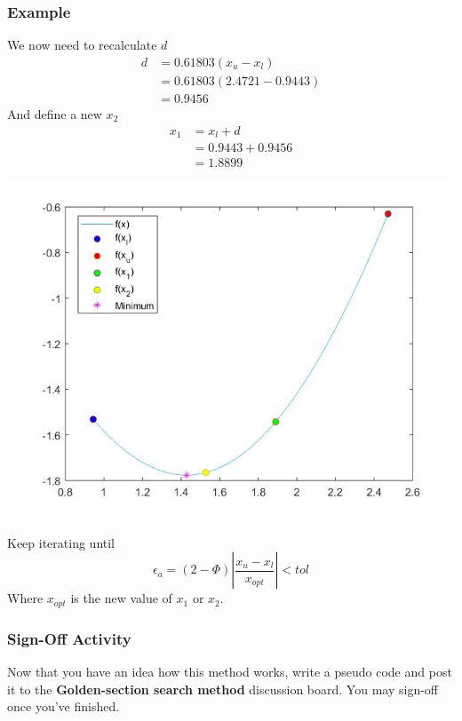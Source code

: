 \documentclass{if-beamer}
\begin{document}
\begin{frame}
	\frametitle{Example}
	
	\begin{minipage}{0.4\textwidth}
		We now need to recalculate $d$
		\begin{align*}
			d &= 0.61803(x_u - x_l)\\
			&=0.61803(2.4721 - 0.9443)\\
			&= 0.9456
		\end{align*}
		And define a new $x_2$
		\begin{align*}
			x_1 &= x_l + d\\
			&= 0.9443 + 0.9456\\
			&= 1.8899
		\end{align*}
		
	\end{minipage}
	\begin{minipage}{0.6\textwidth}
		\centering
		\includegraphics[width = 1.2\textwidth]{figures/iter3.jpg}
	\end{minipage}
Keep iterating until 
$$\epsilon_a = (2-\Phi)\left|\frac{x_u-x_l}{x_{opt}}\right| < tol$$
Where $x_{opt}$ is the new value of $x_1$ or $x_2$.
\end{frame}

\begin{frame}
	\frametitle{Sign-Off Activity}
	Now that you have an idea how this method works, write a pseudo code and post it to the \textbf{Golden-section search method} discussion board. You may sign-off once you've finished. 
\end{frame}
\end{document}
